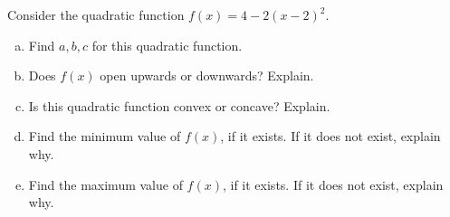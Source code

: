 \documentclass[11pt,letterpaper]{article}
\begin{document}
\newpage



 Consider the quadratic function $f(x)= 4 - 2(x - 2)^2$.
	\begin{enumerate}[(a)]
	\item Find $a, b, c$ for this quadratic function.
	\item Does $f(x)$ open upwards or downwards? Explain.
	\item Is this quadratic function convex or concave? Explain. 
	\item Find the minimum value of $f(x)$, if it exists. If it does not exist, explain why.  
	\item Find the maximum value of $f(x)$, if it exists. If it does not exist, explain why. 
	\end{enumerate}
\end{document}
